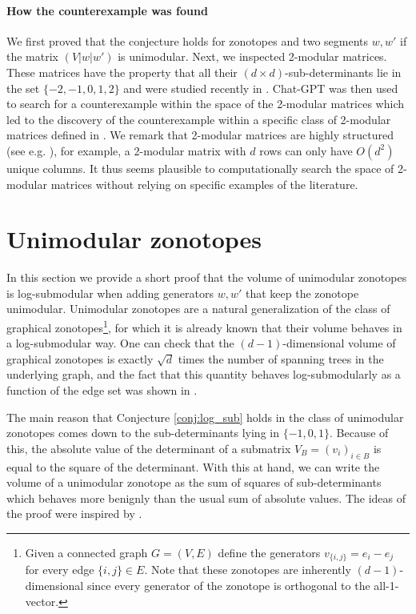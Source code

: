 \documentclass{article}
\theoremstyle{theorem}
\theoremstyle{remark}
\begin{document}
\paragraph{How the counterexample was found}
We first proved that the conjecture holds for zonotopes and two segments $w,w'$ if the matrix $(V|w|w')$ is unimodular. Next, we inspected 2-modular matrices. These matrices have the property that all their $(d\times d)$-sub-determinants lie in the set $\{-2,-1,0,1,2\}$ and were studied recently in \citet{oxley20222}. Chat-GPT was then used to search for a counterexample within the space of the 2-modular matrices which led to the discovery of the counterexample within a specific class of 2-modular matrices defined in \cite{oxley20222}. We remark that 2-modular matrices are highly structured (see e.g. \cite{artmann2017strongly, averkov2024maximal, dadush2026excluding, lee2023polynomial}), for example, a 2-modular matrix with $d$ rows can only have $O(d^2)$ unique columns. It thus seems plausible to computationally search the space of 2-modular matrices without relying on specific examples of the literature.


\section{Unimodular zonotopes}

In this section we provide a short proof that the volume of unimodular zonotopes is log-submodular when adding generators $w,w'$ that keep the zonotope unimodular. Unimodular zonotopes are a natural generalization of the class of graphical zonotopes\footnote{Given a connected graph $G=(V,E)$ define the generators $v_{\{i,j\}} = e_i-e_j$ for every edge $\{i,j\} \in E$. Note that these zonotopes are inherently $(d-1)$-dimensional since every generator of the zonotope is orthogonal to the all-1-vector.}, for which it is already known that their volume behaves in a log-submodular way. One can check that the $(d-1)$-dimensional volume of graphical zonotopes is exactly $\sqrt{d}$ times the number of spanning trees in the underlying graph, and the fact that this quantity behaves log-submodularly as a function of the edge set was shown in \citep{khosoussi2019reliable}.
\par
The main reason that Conjecture \cref{conj:log_sub} holds in the class of unimodular zonotopes comes down to the sub-determinants lying in $\{-1,0,1\}$. Because of this, the absolute value of the determinant of a submatrix $V_B = (v_i)_{i\in B}$ is equal to the square of the determinant. With this at hand, we can write the volume of a unimodular zonotope as the sum of squares of sub-determinants which behaves more benignly than the usual sum of absolute values. The ideas of the proof were inspired by \cite{eisenbrand2026nearly}.
\end{document}
